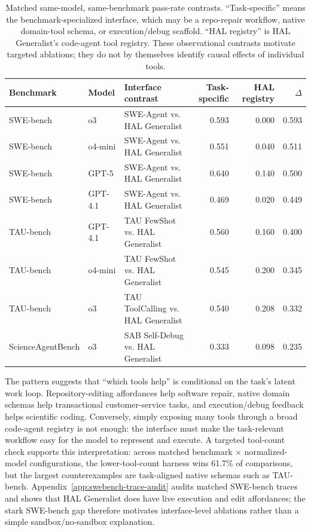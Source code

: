 \documentclass{article}
\begin{document}
\begin{table}[t]
\centering
\footnotesize
\setlength{\tabcolsep}{3pt}
\begin{tabular}{ll>{\raggedright\arraybackslash}p{1.45in}rrr}
\toprule
Benchmark & Model & Interface contrast & Task-specific & HAL registry & $\Delta$ \\
\midrule
SWE-bench & o3 & SWE-Agent vs. HAL Generalist & 0.593 & 0.000 & 0.593 \\
SWE-bench & o4-mini & SWE-Agent vs. HAL Generalist & 0.551 & 0.040 & 0.511 \\
SWE-bench & GPT-5 & SWE-Agent vs. HAL Generalist & 0.640 & 0.140 & 0.500 \\
SWE-bench & GPT-4.1 & SWE-Agent vs. HAL Generalist & 0.469 & 0.020 & 0.449 \\
TAU-bench & GPT-4.1 & TAU FewShot vs. HAL Generalist & 0.560 & 0.160 & 0.400 \\
TAU-bench & o4-mini & TAU FewShot vs. HAL Generalist & 0.545 & 0.200 & 0.345 \\
TAU-bench & o3 & TAU ToolCalling vs. HAL Generalist & 0.540 & 0.208 & 0.332 \\
ScienceAgentBench & o3 & SAB Self-Debug vs. HAL Generalist & 0.333 & 0.098 & 0.235 \\
\bottomrule
\end{tabular}
\caption{Matched same-model, same-benchmark pass-rate contrasts.
``Task-specific'' means the benchmark-specialized interface, which may be a
repo-repair workflow, native domain-tool schema, or execution/debug scaffold.
``HAL registry'' is HAL Generalist's code-agent tool registry. These
observational contrasts motivate targeted ablations; they do not by themselves
identify causal effects of individual tools.}
\label{tab:harness-contrasts}
\end{table}

The pattern suggests that ``which tools help'' is conditional on the task's
latent work loop. Repository-editing affordances help software repair, native
domain schemas help transactional customer-service tasks, and execution/debug
feedback helps scientific coding. Conversely, simply exposing many tools
through a broad code-agent registry is not enough: the interface must make the
task-relevant workflow easy for the model to represent and execute.
A targeted tool-count check supports this interpretation: across matched
benchmark $\times$ normalized-model configurations, the lower-tool-count
harness wins 61.7\% of comparisons, but the largest counterexamples are
task-aligned native schemas such as TAU-bench.
Appendix~\ref{app:swebench-trace-audit} audits matched SWE-bench traces and
shows that HAL Generalist does have live execution and edit affordances; the
stark SWE-bench gap therefore motivates interface-level ablations rather than a
simple sandbox/no-sandbox explanation.
\end{document}
